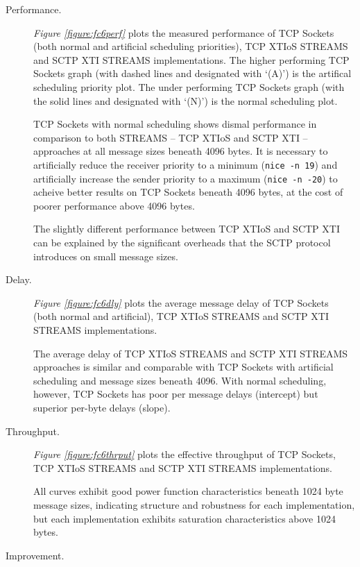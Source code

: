 \documentclass[letterpaper,final,notitlepage,twocolumn,10pt,twoside]{article}
\begin{document}
\begin{description}

\item[Performance.]

\textit{Figure \ref{figure:fc6perf}}
plots the measured performance of TCP Sockets (both normal and artificial scheduling priorities),
TCP XTIoS STREAMS and SCTP XTI STREAMS implementations.
The higher performing TCP Sockets graph (with dashed lines and designated with `(A)') is the
artifical scheduling priority plot.  The under performing TCP Sockets graph (with the solid lines
and designated with `(N)') is the normal scheduling plot.

TCP Sockets with normal scheduling shows dismal performance in comparison to both STREAMS -- TCP
XTIoS and SCTP XTI -- approaches at all message sizes beneath 4096 bytes.  It is necessary to
artificially reduce the receiver priority to a minimum (\texttt{nice -n 19}) and artificially
increase the sender priority to a maximum (\texttt{nice -n -20}) to acheive better results on TCP
Sockets beneath 4096 bytes, at the cost of poorer performance above 4096 bytes.

The slightly different performance between TCP XTIoS and SCTP XTI can be explained by the
significant overheads that the SCTP protocol introduces on small message sizes.

\item[Delay.]

\textit{Figure \ref{figure:fc6dly}}
plots the average message delay of TCP Sockets (both normal and artificial), TCP XTIoS STREAMS and
SCTP XTI STREAMS implementations.

The average delay of TCP XTIoS STREAMS and SCTP XTI STREAMS approaches is similar and comparable
with TCP Sockets with artificial scheduling and message sizes beneath 4096.  With normal scheduling,
however, TCP Sockets has poor per message delays (intercept) but superior per-byte delays (slope).

\item[Throughput.]

\textit{Figure \ref{figure:fc6thrput}}
plots the effective throughput of TCP Sockets, TCP XTIoS STREAMS and SCTP XTI STREAMS
implementations.

All curves exhibit good power function characteristics beneath 1024 byte message sizes, indicating
structure and robustness for each implementation, but each implementation exhibits saturation
characteristics above 1024 bytes.

\item[Improvement.]


\end{description}
\end{document}
